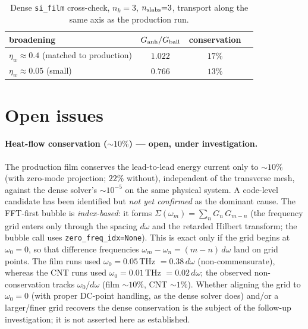 \begin{table}[ht]
\centering
\caption{Dense \texttt{si\_film} cross-check, $n_k{=}3$, $n_{\rm slabs}{=}3$,
transport along the same axis as the production run.}
\label{tab:prod_dense}
\begin{tabular}{lccc}
\hline
broadening & $G_{\rm anh}/G_{\rm ball}$ & conservation \\
\hline
$\eta_w\approx0.4$ (matched to production) & $1.022$ & $17\%$ \\
$\eta_w\approx0.05$ (small) & $0.766$ & $13\%$ \\
\hline
\end{tabular}
\end{table}

\section{Open issues}
\label{sec:prod_open}

\paragraph{Heat-flow conservation ($\sim10\%$) --- open, under
investigation.} The production film conserves the lead-to-lead energy
current only to $\sim10\%$ (with zero-mode projection; $22\%$ without),
independent of the transverse mesh, against the dense solver's
$\sim10^{-5}$ on the same physical system. A code-level candidate has been
identified but \emph{not yet confirmed} as the dominant cause. The
FFT-first bubble is \emph{index-based}: it forms
$\Sigma(\omega_m)=\sum_n G_n\,G_{m-n}$ (the frequency grid enters only
through the spacing $d\omega$ and the retarded Hilbert transform; the
bubble call uses \texttt{zero\_freq\_idx=None}). This is exact only if the
grid begins at $\omega_0=0$, so that difference frequencies
$\omega_m-\omega_n=(m-n)\,d\omega$ land on grid points. The film runs used
$\omega_0=0.05$\,THz $=0.38\,d\omega$ (non-commensurate), whereas the CNT
runs used $\omega_0=0.01$\,THz $=0.02\,d\omega$; the observed
non-conservation tracks $\omega_0/d\omega$ (film $\sim10\%$, CNT
$\sim1\%$). Whether aligning the grid to $\omega_0=0$ (with proper
DC-point handling, as the dense solver does) and/or a larger/finer grid
recovers the dense conservation is the subject of the follow-up
investigation; it is not asserted here as established.

